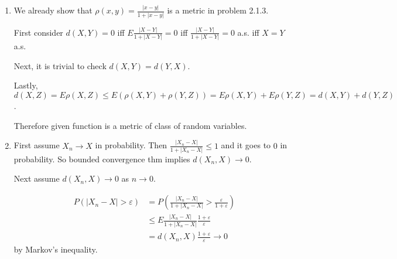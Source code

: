 \begin{problem}[2.3.6.] \hfill
	\begin{enumerate}[label = (\alph*)]
		\item We already show that $\rho(x, y) = \frac{|x-y|}{1+|x-y|}$ is a metric in problem 2.1.3.

			First consider $d(X, Y) = 0$ iff $E\frac{|X-Y|}{1+|X-Y|} = 0$ iff $\frac{|X-Y|}{1+|X-Y|} = 0$ a.s. iff $X=Y$ a.s.

			Next, it is trivial to check $d(X, Y) = d(Y, X)$.

			Lastly, $d(X, Z) = E\rho(X, Z) \leq E\left( \rho(X, Y)+\rho(Y, Z) \right) = E\rho(X, Y) + E\rho(Y, Z) = d(X, Y) + d(Y, Z)$.

			Therefore given function is a metric of class of random variables.

		\item First assume $X_n \rightarrow X$ in probability. Then $\frac{|X_n - X|}{1+|X_n - X|} \leq 1$ and it goes to $0$ in probability. So bounded convergence thm implies $d(X_n, X) \rightarrow 0$.

			Next assume $d(X_n, X) \rightarrow 0$ as $n\rightarrow 0$. 

			\begin{equation*}
				\begin{split}
					P(|X_n -X| > \varepsilon)
					& = P\left( \frac{|X_n - X|}{1+|X_n - X|} > \frac{\varepsilon}{1+\varepsilon} \right) \\
					& \leq E\frac{|X_n - X|}{1+|X_n - X|} \frac{1+\varepsilon}{\varepsilon} \\
					& = d(X_n, X) \frac{1+\varepsilon}{\varepsilon} \rightarrow 0 
				\end{split}
			\end{equation*}
			by Markov's inequality.
	\end{enumerate}
	
\end{problem}

